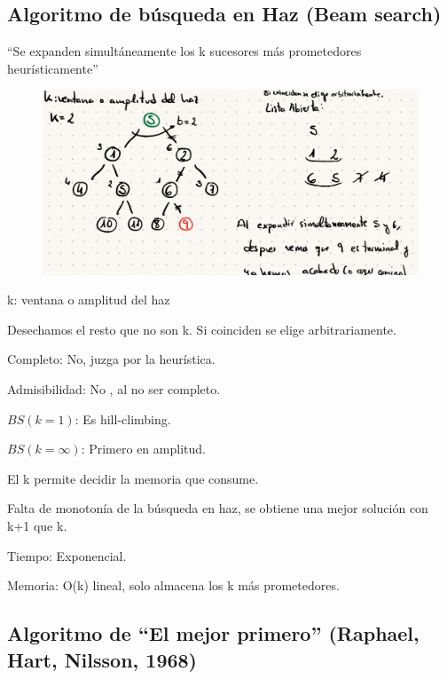 \documentclass[12pt, twoside, openright]{report} %
\begin{document}
\subsection{Algoritmo de búsqueda en Haz (Beam search)}

  ``Se expanden simultáneamente los k sucesores más prometedores
  heurísticamente''
  \begin{figure}[H]
	{\includegraphics[scale=.22]{Untitled 54.png}}
\end{figure}
 
    k: ventana o amplitud del haz

	Desechamos el resto que no son k. Si coinciden se elige
    arbitrariamente.

	Completo: No, juzga por la heurística.

	Admisibilidad: No , al no ser completo.

	\(BS(k=1)\): Es hill-climbing.

	\(BS(k= \infty)\): Primero en amplitud.

	El k permite decidir la memoria que consume.

	Falta de monotonía de la búsqueda en haz, se obtiene una mejor
    solución con k+1 que k.

	Tiempo: Exponencial.

	Memoria: O(k) lineal, solo almacena los k más prometedores.

	
\subsection{Algoritmo de ``El mejor primero'' (Raphael, Hart, Nilsson, 1968)}
  
\end{document}
